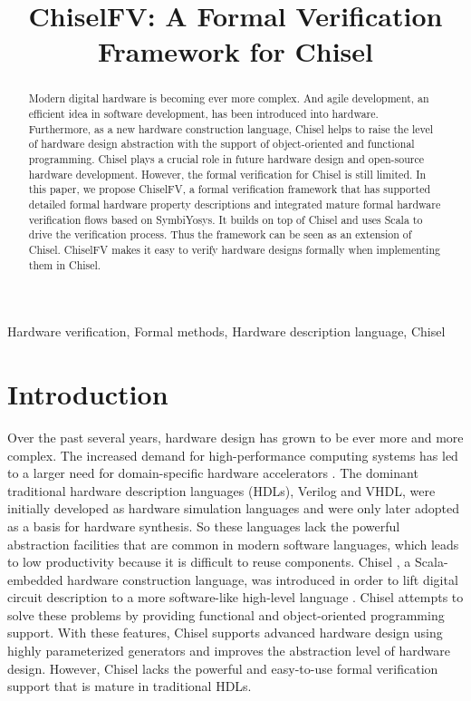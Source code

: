 \documentclass[conference]{IEEEtran}
\theoremstyle{definition}
\begin{document}
\title{ChiselFV: A Formal Verification Framework for Chisel
}


\maketitle

\begin{abstract}
    Modern digital hardware is becoming ever more complex. And agile development, an efficient idea in software development, has been introduced into hardware. Furthermore, as a new hardware construction language, Chisel helps to raise the level of hardware design abstraction with the support of object-oriented and functional programming. Chisel plays a crucial role in future hardware design and open-source hardware development. However, the formal verification for Chisel is still limited. In this paper, we propose ChiselFV, a formal verification framework that has supported detailed formal hardware property descriptions and integrated mature formal hardware verification flows based on SymbiYosys. It builds on top of Chisel and uses Scala to drive the verification process. Thus the framework can be seen as an extension of Chisel. ChiselFV makes it easy to verify hardware designs formally when implementing them in Chisel.
\end{abstract}

\begin{IEEEkeywords}
    Hardware verification, Formal methods, Hardware description language, Chisel
\end{IEEEkeywords}

\section{Introduction}
Over the past several years, hardware design has grown to be ever more and more complex. The increased demand for high-performance computing systems has led to a larger need for domain-specific hardware accelerators \cite{dally2020domain}.
The dominant traditional hardware description languages (HDLs), Verilog and VHDL, were initially developed as hardware simulation languages and were only later adopted as a basis for hardware synthesis. So these languages lack the powerful abstraction facilities that are common in modern software languages, which leads to low productivity because it is difficult to reuse components.
Chisel \cite{bachrach2012chisel}, a Scala-embedded hardware construction language, was introduced in order to lift digital circuit description to a more software-like high-level language \cite{dobis2021chiselverify}.
Chisel attempts to solve these problems by providing functional and object-oriented programming support. With these features, Chisel supports advanced hardware design using highly parameterized generators and improves the abstraction level of hardware design. However, Chisel lacks the powerful and easy-to-use formal verification support that is mature in traditional HDLs.
\end{document}
